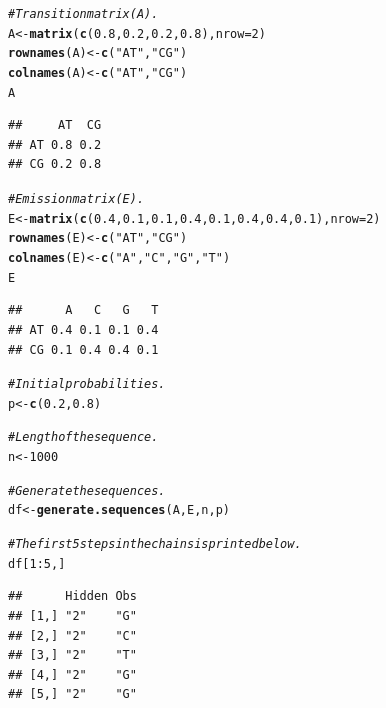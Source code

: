 \documentclass{article}\usepackage[]{graphicx}\usepackage[]{color}
\makeatletter
\newcommand{\hlnum}[1]{\textcolor[rgb]{0.686,0.059,0.569}{#1}}%
\newcommand{\hlstr}[1]{\textcolor[rgb]{0.192,0.494,0.8}{#1}}%
\newcommand{\hlcom}[1]{\textcolor[rgb]{0.678,0.584,0.686}{\textit{#1}}}%
\newcommand{\hlopt}[1]{\textcolor[rgb]{0,0,0}{#1}}%
\newcommand{\hlstd}[1]{\textcolor[rgb]{0.345,0.345,0.345}{#1}}%
\newcommand{\hlkwb}[1]{\textcolor[rgb]{0.69,0.353,0.396}{#1}}%
\newcommand{\hlkwc}[1]{\textcolor[rgb]{0.333,0.667,0.333}{#1}}%
\newcommand{\hlkwd}[1]{\textcolor[rgb]{0.737,0.353,0.396}{\textbf{#1}}}%
\newenvironment{kframe}{%
 \def\at@end@of@kframe{}%
 \ifinner\ifhmode%
  \def\at@end@of@kframe{\end{minipage}}%
  \begin{minipage}{\columnwidth}%
 \fi\fi%
 \def\FrameCommand##1{\hskip\@totalleftmargin \hskip-\fboxsep
 \colorbox{shadecolor}{##1}\hskip-\fboxsep
     \hskip-\linewidth \hskip-\@totalleftmargin \hskip\columnwidth}%
 \MakeFramed {\advance\hsize-\width
   \@totalleftmargin\z@ \linewidth\hsize
   \@setminipage}}%
 {\par\unskip\endMakeFramed%
 \at@end@of@kframe}
\newenvironment{knitrout}{}{} %
\makeatother
\begin{document}
\begin{knitrout}
\color{fgcolor}\begin{kframe}
\begin{alltt}
\hlcom{# Transition matrix (A).}
\hlstd{A} \hlkwb{<-} \hlkwd{matrix}\hlstd{(}\hlkwd{c}\hlstd{(}\hlnum{0.8}\hlstd{,} \hlnum{0.2}\hlstd{,} \hlnum{0.2}\hlstd{,} \hlnum{0.8}\hlstd{),} \hlkwc{nrow} \hlstd{=} \hlnum{2}\hlstd{)}
\hlkwd{rownames}\hlstd{(A)} \hlkwb{<-} \hlkwd{c}\hlstd{(}\hlstr{"AT"}\hlstd{,} \hlstr{"CG"}\hlstd{)}
\hlkwd{colnames}\hlstd{(A)} \hlkwb{<-} \hlkwd{c}\hlstd{(}\hlstr{"AT"}\hlstd{,} \hlstr{"CG"}\hlstd{)}
\hlstd{A}
\end{alltt}
\begin{verbatim}
##     AT  CG
## AT 0.8 0.2
## CG 0.2 0.8
\end{verbatim}
\begin{alltt}
\hlcom{# Emission matrix (E).}
\hlstd{E} \hlkwb{<-} \hlkwd{matrix}\hlstd{(}\hlkwd{c}\hlstd{(}\hlnum{0.4}\hlstd{,} \hlnum{0.1}\hlstd{,} \hlnum{0.1}\hlstd{,} \hlnum{0.4}\hlstd{,} \hlnum{0.1}\hlstd{,} \hlnum{0.4}\hlstd{,} \hlnum{0.4}\hlstd{,} \hlnum{0.1}\hlstd{),} \hlkwc{nrow} \hlstd{=} \hlnum{2}\hlstd{)}
\hlkwd{rownames}\hlstd{(E)} \hlkwb{<-} \hlkwd{c}\hlstd{(}\hlstr{"AT"}\hlstd{,} \hlstr{"CG"}\hlstd{)}
\hlkwd{colnames}\hlstd{(E)} \hlkwb{<-} \hlkwd{c}\hlstd{(}\hlstr{"A"}\hlstd{,} \hlstr{"C"}\hlstd{,} \hlstr{"G"}\hlstd{,} \hlstr{"T"}\hlstd{)}
\hlstd{E}
\end{alltt}
\begin{verbatim}
##      A   C   G   T
## AT 0.4 0.1 0.1 0.4
## CG 0.1 0.4 0.4 0.1
\end{verbatim}
\begin{alltt}
\hlcom{# Initial probabilities.}
\hlstd{p} \hlkwb{<-} \hlkwd{c}\hlstd{(}\hlnum{0.2}\hlstd{,}\hlnum{0.8}\hlstd{)}

\hlcom{# Length of the sequence.}
\hlstd{n} \hlkwb{<-} \hlnum{1000}

\hlcom{# Generate the sequences. }
\hlstd{df} \hlkwb{<-} \hlkwd{generate.sequences}\hlstd{(A, E, n, p)}

\hlcom{# The first 5 steps in the chains is printed below. }
\hlstd{df[}\hlnum{1}\hlopt{:}\hlnum{5}\hlstd{, ]}
\end{alltt}
\begin{verbatim}
##      Hidden Obs
## [1,] "2"    "G"
## [2,] "2"    "C"
## [3,] "2"    "T"
## [4,] "2"    "G"
## [5,] "2"    "G"
\end{verbatim}
\end{kframe}
\end{knitrout}
\end{document}
